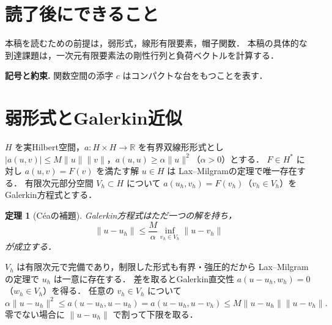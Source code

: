 \documentclass[a5paper,10pt,onecolumn]{jsarticle}
\makeatletter
\theoremstyle{mathnotetheorem}
\newtheorem{theorem}{定理}[section]
\renewcommand{\proofname}{証明}
\renewenvironment{proof}[1][\proofname]{%
  \par\pushQED{\qed}\normalfont\topsep4\p@\@plus2\p@\relax
  \trivlist\item[\hskip\labelsep\bfseries #1]\ignorespaces
}{\popQED\endtrivlist\@endpefalse}
\newcommand{\norm}[1]{\lVert #1\rVert}
\makeatother
\begin{document}
\section*{読了後にできること}
本稿を読むための前提は，弱形式，線形有限要素，帽子関数．
本稿の具体的な到達課題は，一次元有限要素法の剛性行列と負荷ベクトルを計算する．


\par\noindent\textbf{記号と約束.}\quad
関数空間の添字 $c$ はコンパクトな台をもつことを表す．
\par

\section{弱形式とGalerkin近似}
$H$ を実Hilbert空間，$a:H\times H\to\mathbb R$ を有界双線形形式とし
$|a(u,v)|\le M\norm u\norm v$，$a(u,u)\ge\alpha\norm u^2$（$\alpha>0$）とする．
$F\in H^*$ に対し $a(u,v)=F(v)$ を満たす解 $u\in H$ は
Lax--Milgramの定理で唯一存在する．
有限次元部分空間 $V_h\subset H$ について
$ a(u_h,v_h)=F(v_h)$（$v_h\in V_h$）をGalerkin方程式とする．
\begin{theorem}[C\'eaの補題]\label{thm:Cea}
Galerkin方程式はただ一つの解を持ち，
\[
 \norm{u-u_h}\le\frac{M}{\alpha}
  \inf_{v_h\in V_h}\norm{u-v_h}
\]
が成立する．
\end{theorem}
\begin{proof}
$V_h$ は有限次元で完備であり，制限した形式も有界・強圧的だから
Lax--Milgramの定理で $u_h$ は一意に存在する．
差を取るとGalerkin直交性
$a(u-u_h,w_h)=0$（$w_h\in V_h$）を得る．
任意の $v_h\in V_h$ について
\[
 \alpha\norm{u-u_h}^2\le a(u-u_h,u-u_h)
  =a(u-u_h,u-v_h)
  \le M\norm{u-u_h}\norm{u-v_h}.
\]
零でない場合に $\norm{u-u_h}$ で割って下限を取る．
\end{proof}
\end{document}

